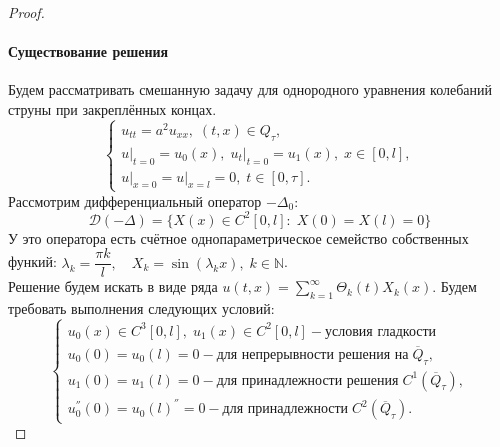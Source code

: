 \documentclass[../main.tex]{subfiles}
\begin{document}
\begin{proof}
\paragraph{Существование решения} Будем рассматривать смешанную задачу для однородного уравнения колебаний струны при закреплённых концах.
\begin{equation*}
\label{eq:13_2}
\begin{cases}
	u_{tt} = a^2u_{xx},\; (t, x) \in Q_{\tau}, \\
	u\bigr|_{t = 0} = u_0(x),\; u_t\bigr|_{t = 0} = u_1(x),\; x \in [0, l], \\
	u\bigr|_{x = 0} = u\bigr|_{x = l} = 0,\; t \in [0, \tau].
\end{cases}
\end{equation*}
Рассмотрим дифференциальный оператор $-\Delta_{0}$:
$$\mathcal{D}(-\Delta) =\{X(x) \in C^2[0, l]\colon\; X(0) = X(l) = 0\}$$
У это оператора есть счётное однопараметрическое семейство собственных функий: $\lambda_k = \dfrac{\pi k}{l},\quad X_k = \sin(\lambda_k x),\; k \in \mathbb{N}$. \\
Решение будем искать в виде ряда $u(t, x) = \sum\limits_{k = 1}^{\infty} \Theta_k(t)X_k(x)$. Будем требовать выполнения следующих условий:
\begin{equation}
\begin{cases}
	u_0(x) \in C^3[0, l],\; u_1(x) \in C^2[0, l] - \textbf{условия гладкости}\\
	u_0(0) = u_0(l) = 0 - \text{для непрерывности решения на}\; \overline{Q}_{\tau}, \\
	u_1(0) = u_1(l) = 0 - \text{для принадлежности решения}\; C^1(\overline{Q}_{\tau}), \\
	u^{''}_0(0) = u_0(l)^{''} = 0 - \text{для принадлежности}\; C^2(\overline{Q}_{\tau}).
\end{cases}
\end{equation}


\end{proof}
\end{document}
